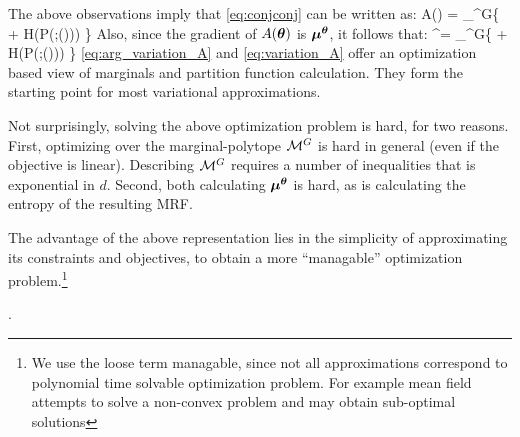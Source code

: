 The above observations imply that \eqref{eq:conjconj} can be written as:
\be
A(\thetav) = \sup_{\muv \in \margpoly^G}\left \{ \muv \cdot \thetav + H(P(\xx;\thetav(\muv))) \right\} \label{eq:variation_A} 
\ee
Also, since the gradient of $A(\boldsymbol{\theta})$ is $\boldsymbol{\mu}^{\boldsymbol{\theta}}$, it follows that:
\be
\muv^{\thetav}= \arg \sup_{\muv \in \margpoly^G}\left \{ \muv \cdot \thetav + H(P(\xx;\thetav(\muv))) \right\} \label{eq:arg_variation_A}
\ee
\eqref{eq:arg_variation_A} and \eqref{eq:variation_A} offer an optimization based view of marginals and partition function calculation. They form the starting point for most
variational approximations.


Not surprisingly, solving the above optimization problem is hard, for two reasons. First,  optimizing over the marginal-polytope ${\cal{M}}^G$ is hard in general (even if the objective is linear). Describing ${\cal{M}}^G$ requires a number of inequalities that is exponential in $d$.  Second, both calculating $\boldsymbol{\mu}^{\boldsymbol{\theta}}$ is hard, as is calculating the entropy of the resulting MRF.

The advantage of the above representation lies in the simplicity of approximating its constraints and objectives, to obtain a more ``managable'' optimization problem.\footnote{We use the loose term managable, since not all approximations correspond to polynomial time solvable optimization problem. For example mean field attempts to solve a non-convex problem and may obtain sub-optimal solutions}

.
